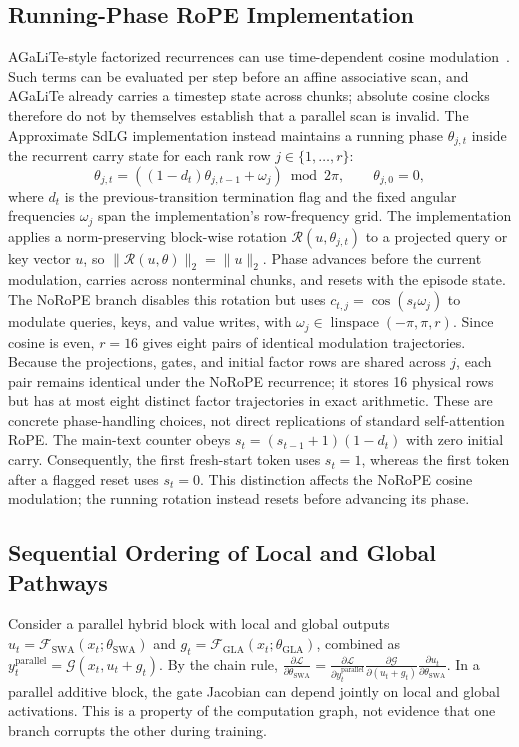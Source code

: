 \subsection{Running-Phase RoPE Implementation}
\label{app:running_phase_rope}
AGaLiTe-style factorized recurrences can use time-dependent cosine modulation~\cite{pramanik2024agalite}. Such terms can be evaluated per step before an affine associative scan, and AGaLiTe already carries a timestep state across chunks; absolute cosine clocks therefore do not by themselves establish that a parallel scan is invalid. The Approximate SdLG implementation instead maintains a running phase $\theta_{j,t}$ inside the recurrent carry state for each rank row $j\in\{1,\ldots,r\}$:
\begin{equation}
    \theta_{j,t}=((1-d_t)\theta_{j,t-1}+\omega_j)\bmod 2\pi,\qquad \theta_{j,0}=0,
\end{equation}
where $d_t$ is the previous-transition termination flag and the fixed angular frequencies $\omega_j$ span the implementation's row-frequency grid. The implementation applies a norm-preserving block-wise rotation $\mathcal{R}(u,\theta_{j,t})$ to a projected query or key vector $u$, so $\|\mathcal{R}(u,\theta)\|_2=\|u\|_2$. Phase advances before the current modulation, carries across nonterminal chunks, and resets with the episode state. The NoRoPE branch disables this rotation but uses $c_{t,j}=\cos(s_t\omega_j)$ to modulate queries, keys, and value writes, with $\omega_j\in\operatorname{linspace}(-\pi,\pi,r)$. Since cosine is even, $r=16$ gives eight pairs of identical modulation trajectories. Because the projections, gates, and initial factor rows are shared across $j$, each pair remains identical under the NoRoPE recurrence; it stores 16 physical rows but has at most eight distinct factor trajectories in exact arithmetic. These are concrete phase-handling choices, not direct replications of standard self-attention RoPE. The main-text counter obeys $s_t=(s_{t-1}+1)(1-d_t)$ with zero initial carry. Consequently, the first fresh-start token uses $s_t=1$, whereas the first token after a flagged reset uses $s_t=0$. This distinction affects the NoRoPE cosine modulation; the running rotation instead resets before advancing its phase.

\subsection{Sequential Ordering of Local and Global Pathways}
\label{app:gradient_decoupling_proof}
Consider a parallel hybrid block with local and global outputs $u_t=\mathcal{F}_{\mathrm{SWA}}(x_t;\theta_{\mathrm{SWA}})$ and $g_t=\mathcal{F}_{\mathrm{GLA}}(x_t;\theta_{\mathrm{GLA}})$, combined as $y_t^{\mathrm{parallel}}=\mathcal{G}(x_t,u_t+g_t)$.
By the chain rule, $\frac{\partial \mathcal{L}}{\partial \theta_{\mathrm{SWA}}}=\frac{\partial \mathcal{L}}{\partial y_t^{\mathrm{parallel}}}\frac{\partial \mathcal{G}}{\partial(u_t+g_t)}\frac{\partial u_t}{\partial\theta_{\mathrm{SWA}}}$. In a parallel additive block, the gate Jacobian can depend jointly on local and global activations. This is a property of the computation graph, not evidence that one branch corrupts the other during training.

